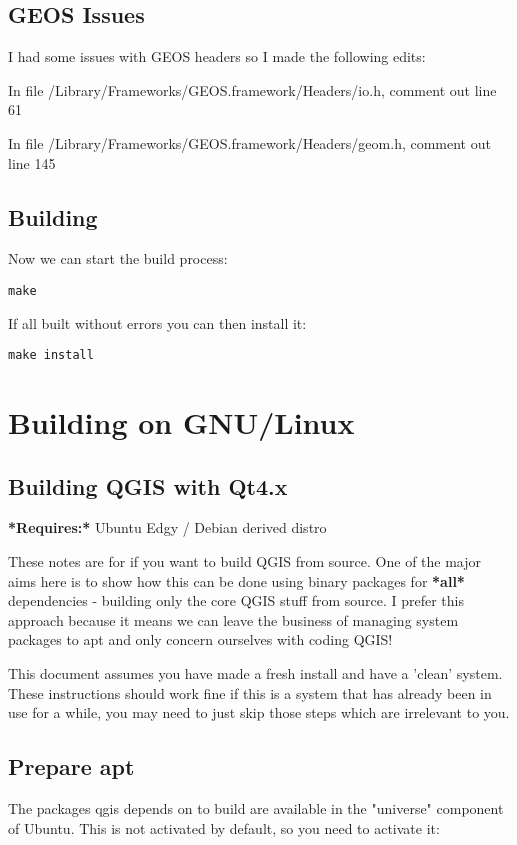 \subsection{GEOS Issues}
I had some issues with GEOS headers so I made the following edits:

In file /Library/Frameworks/GEOS.framework/Headers/io.h, comment out line 61

In file /Library/Frameworks/GEOS.framework/Headers/geom.h, comment out line 145

\subsection{Building}
Now we can start the build process:

\begin{verbatim}
make 
\end{verbatim}

If all built without errors you can then install it:

\begin{verbatim}
make install 
\end{verbatim}


\section{Building on GNU/Linux}\label{sec:install_linux}
\subsection{Building QGIS with Qt4.x}
\textbf{*Requires:*} Ubuntu Edgy / Debian derived distro

These notes are for if you want to build QGIS from source. One of the major
aims here is to show how this can be done using binary packages for \textbf{*all*}
dependencies - building only the core QGIS stuff from source. I prefer this
approach because it means we can leave the business of managing system packages
to apt and only concern ourselves with coding QGIS! 

This document assumes you have made a fresh install and have a 'clean' system.
These instructions should work fine if this is a system that has already been
in use for a while, you may need to just skip those steps which are irrelevant
to you.

\subsection{Prepare apt}
The packages qgis depends on to build are available in the "universe" component
of Ubuntu. This is not activated by default, so you need to activate it:

